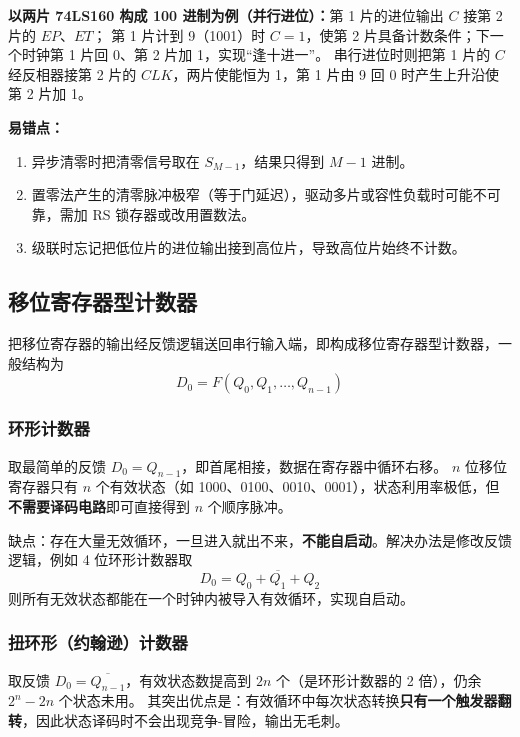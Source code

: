 \noindent \textbf{以两片 74LS160 构成 100 进制为例（并行进位）：}第 1 片的进位输出 $C$ 接第 2 片的 $EP$、$ET$；
第 1 片计到 9（1001）时 $C=1$，使第 2 片具备计数条件；下一个时钟第 1 片回 0、第 2 片加 1，实现“逢十进一”。
串行进位时则把第 1 片的 $C$ 经反相器接第 2 片的 $CLK$，两片使能恒为 1，第 1 片由 9 回 0 时产生上升沿使第 2 片加 1。

\noindent\textbf{易错点：}
\begin{enumerate}
    \item 异步清零时把清零信号取在 $S_{M-1}$，结果只得到 $M-1$ 进制。
    \item 置零法产生的清零脉冲极窄（等于门延迟），驱动多片或容性负载时可能不可靠，需加 RS 锁存器或改用置数法。
    \item 级联时忘记把低位片的进位输出接到高位片，导致高位片始终不计数。
\end{enumerate}

\subsection{移位寄存器型计数器}
\label{sec:shift_counter}
把移位寄存器的输出经反馈逻辑送回串行输入端，即构成移位寄存器型计数器，一般结构为
\begin{equation}
D_0 = F(Q_0,Q_1,\dots,Q_{n-1})
\label{eq:shift_fb}
\end{equation}

\subsubsection{环形计数器}
取最简单的反馈 $D_0=Q_{n-1}$，即首尾相接，数据在寄存器中循环右移。
$n$ 位移位寄存器只有 $n$ 个有效状态（如 1000、0100、0010、0001），状态利用率极低，但\textbf{不需要译码电路}即可直接得到 $n$ 个顺序脉冲。

\noindent 缺点：存在大量无效循环，一旦进入就出不来，\textbf{不能自启动}。解决办法是修改反馈逻辑，例如 4 位环形计数器取
\begin{equation}
D_0 = \overline{Q_0+Q_1+Q_2}
\label{eq:ring_start}
\end{equation}
则所有无效状态都能在一个时钟内被导入有效循环，实现自启动。

\subsubsection{扭环形（约翰逊）计数器}
取反馈 $D_0=\overline{Q_{n-1}}$，有效状态数提高到 $2n$ 个（是环形计数器的 2 倍），仍余 $2^n-2n$ 个状态未用。
其突出优点是：有效循环中每次状态转换\textbf{只有一个触发器翻转}，因此状态译码时不会出现竞争-冒险，输出无毛刺。

